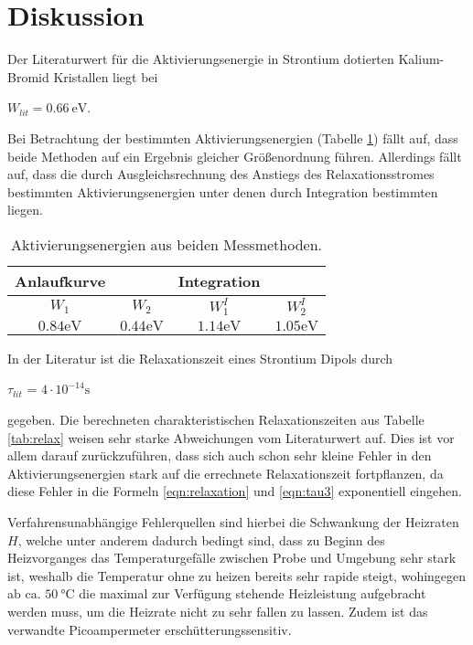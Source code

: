\section{Diskussion}
\label{sec:Diskussion}
Der Literaturwert für die Aktivierungsenergie in Strontium dotierten Kalium-Bromid Kristallen liegt bei
\begin{center}
  $W_{lit} = \SI{0.66}{\electronvolt}$\cite{literaturwert}.
\end{center}
Bei Betrachtung der bestimmten Aktivierungsenergien (Tabelle \ref{tab:alen})
fällt auf, dass beide Methoden auf ein Ergebnis gleicher Größenordnung führen. Allerdings fällt auf, dass die durch Ausgleichsrechnung des Anstiegs des Relaxationsstromes bestimmten Aktivierungsenergien unter denen durch Integration bestimmten liegen.
\begin{table}[H]
  \centering
  \caption{Aktivierungsenergien aus beiden Messmethoden.}
  \label{tab:alen}
  \begin{tabular}{c|c|c|c}
    Anlaufkurve&&Integration&\\
    \hline
    $W_1$ & $W_2$ & $W_1^I$ & $W_2^I$\\
    \hline
    $0.84\si{\electronvolt}$ & $0.44\si{\electronvolt}$ & $1.14\si{\electronvolt}$ & $1.05\si{\electronvolt}$ \\
  \end{tabular}
\end{table}

In der Literatur \cite{literaturwert} ist die Relaxationszeit eines Strontium Dipols durch
\begin{center}
  $\tau_{lit}$ = $4\cdot10^{-14}\si{\second}$
\end{center}
gegeben.
Die berechneten charakteristischen Relaxationszeiten aus Tabelle \ref{tab:relax} weisen sehr starke Abweichungen vom Literaturwert auf.
Dies ist vor allem darauf zurückzuführen, dass sich auch schon sehr kleine Fehler in den Aktivierungsenergien stark auf die errechnete Relaxationszeit fortpflanzen, da diese Fehler in die Formeln \eqref{eqn:relaxation} und \eqref{eqn:tau3} exponentiell eingehen.

Verfahrensunabhängige Fehlerquellen sind hierbei die Schwankung der Heizraten $H$, welche unter anderem dadurch bedingt sind, dass zu Beginn des Heizvorganges das Temperaturgefälle zwischen Probe und Umgebung sehr stark ist, weshalb die Temperatur ohne zu heizen bereits sehr rapide steigt, wohingegen ab ca. $\SI{50}{\celsius}$ die maximal zur Verfügung stehende Heizleistung aufgebracht werden muss, um die Heizrate nicht zu sehr fallen zu lassen. Zudem ist das verwandte Picoampermeter erschütterungssensitiv.
